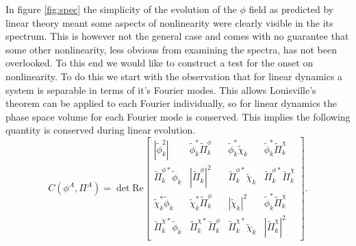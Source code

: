 In figure \ref{fig:spec} the simplicity of the evolution of the $\phi$ field as predicted by linear theory meant some aspects of nonlinearity were clearly visible in the its spectrum. This is however not the general case and comes with no guarantee that some other nonlinearity, less obvious from examining the spectra, has not been overlooked.
To this end we would like to construct a test for the onset on nonlinearity.
To do this we start with the observation that for linear dynamics a system is separable in terms of it's Fourier modes.
This allows Louisville's theorem can be applied to each Fourier individually, so for linear dynamics the phase space volume for each Fourier mode is conserved.
This implies the following quantity is conserved during linear evolution.
\begin{equation}
  C(\phi^A,\Pi^A) =
  \det\mathrm{Re}\left[
    \begin{matrix}
      |\tilde{\phi}_k^2| & \tilde{\phi}_k^*\tilde{\Pi}^\phi_k & \tilde{\phi}_k^*\tilde{\chi}_k & \tilde{\phi}_k^*\tilde{\Pi}^\chi_k \\
      \tilde{\Pi}^{\phi *}_k\tilde{\phi}_k & |\tilde{\Pi}^\phi_k|^2 & \tilde{\Pi}^{\phi *}_k\tilde{\chi}_k & \tilde{\Pi}^{\phi *}_k\tilde{\Pi}^\chi_k \\
      \tilde{\chi}_k^*\tilde{\phi}_k & \tilde{\chi}_k^*\tilde{\Pi}^\phi_k & |\tilde{\chi}_k|^2 & \tilde{\phi}_k^*\tilde{\Pi}^\chi_k \\
      \tilde{\Pi}^{\chi *}_k\tilde{\phi}_k & \tilde{\Pi}^{\chi *}_k\tilde{\Pi}^\phi_k & \tilde{\Pi}^{\chi *}_k\tilde{\chi}_k & |\tilde{\Pi}^\chi_k|^2
    \end{matrix}
  \right].
\end{equation}


